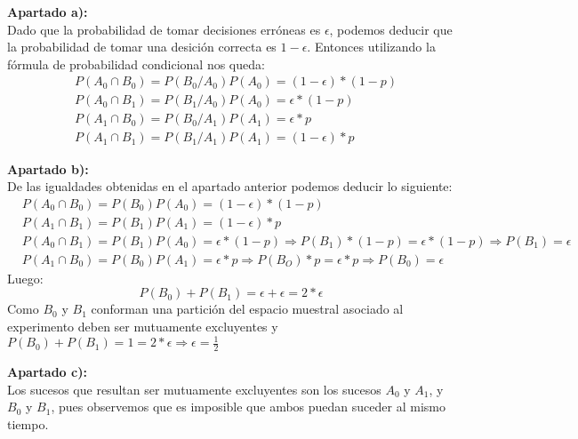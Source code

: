 \documentclass[11pt]{article}
\begin{document}
\begin{justify}
  \textbf{Apartado a):} \\
  Dado que la probabilidad de tomar decisiones erróneas es $\epsilon$,
  podemos deducir que la probabilidad de tomar una desición correcta es
  $1 - \epsilon$. Entonces utilizando la fórmula de probabilidad condicional
  nos queda:
  \begin{align*}
    &P(A_0 \cap B_0) = P(B_0/A_0)P(A_0) = (1 - \epsilon) * (1-p) \\
    &P(A_0 \cap B_1) = P(B_1/A_0)P(A_0) = \epsilon * (1-p) \\
    &P(A_1 \cap B_0) = P(B_0/A_1)P(A_1) = \epsilon * p \\
    &P(A_1 \cap B_1) = P(B_1/A_1)P(A_1) = (1 - \epsilon) * p
  \end{align*}
\end{justify}


\begin{justify}
  \textbf{Apartado b):} \\
  De las igualdades obtenidas en el apartado anterior podemos deducir lo siguiente:
  \begin{align*}
    &P(A_0 \cap B_0) = P(B_0)P(A_0) = (1 - \epsilon) * (1-p) \\
    &P(A_1 \cap B_1) = P(B_1)P(A_1) = (1 - \epsilon) * p \\
    &P(A_0 \cap B_1) = P(B_1)P(A_0) = \epsilon * (1-p) 
    \Rightarrow P(B_1)*(1-p) = \epsilon*(1-p) \Rightarrow P(B_1) = \epsilon \\
    &P(A_1 \cap B_0) = P(B_0)P(A_1) = \epsilon * p
    \Rightarrow P(B_O)*p = \epsilon*p \Rightarrow P(B_0) = \epsilon
  \end{align*}
  Luego:
  \begin{equation*}
    P(B_0) + P(B_1) = \epsilon + \epsilon = 2*\epsilon
  \end{equation*}
  Como $B_0$ y $B_1$ conforman una partición del espacio muestral asociado al
  experimento deben ser mutuamente excluyentes
  y $P(B_0) + P(B_1) = 1 = 2*\epsilon \Rightarrow \epsilon = \frac{1}{2}$
\end{justify}


\begin{justify}
  \textbf{Apartado c):} \\
  Los sucesos que resultan ser mutuamente excluyentes son los sucesos $A_0$ y
  $A_1$, y $B_0$ y $B_1$, pues observemos que es imposible que ambos puedan
  suceder al mismo tiempo.
\end{justify}
\end{document}
